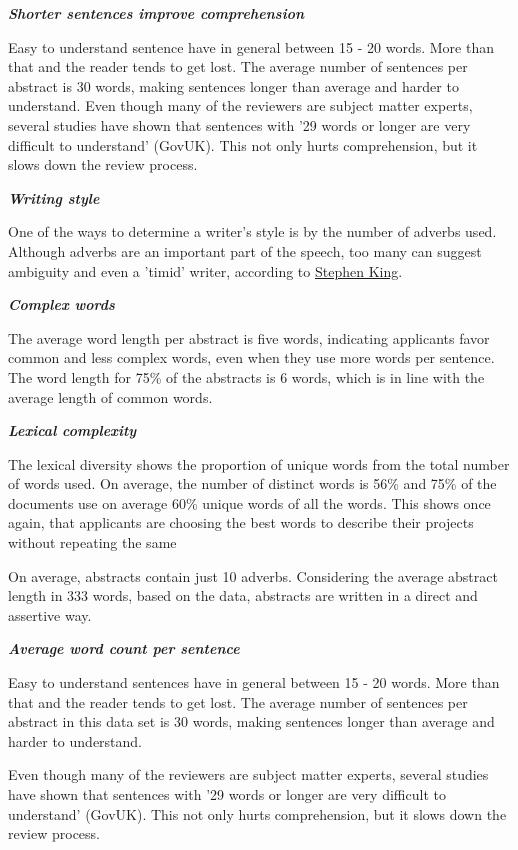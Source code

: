 \documentclass[11pt, oneside]{article}   	%
\begin{document}
\break
\textbf{\emph{Shorter sentences improve comprehension} }
 
Easy to understand sentence have in general between 15 - 20 words. More than that and the reader tends to get lost. The average number of sentences per abstract is 30 words, making sentences longer than average and harder to understand. Even though many of the reviewers are subject matter experts, several studies have shown that sentences with '29 words or longer are very difficult to understand' (GovUK). This not only hurts comprehension, but it slows down the review process.

\textbf{\emph{Writing style} } 

One of the ways to determine a writer's style is by the number of adverbs used. Although adverbs are an important part of the speech, too many can suggest ambiguity and even a 'timid' writer, according to \href{https://www.brainpickings.org/2013/03/13/stephen-king-on-adverbs/}{Stephen King}. 
 
\textbf{\emph{Complex words} } 

The average word length per abstract is five words, indicating applicants favor common and less complex words, even when they use more words per sentence. The word length for 75\% of the abstracts is 6 words, which is in line with the average length of common words.

\textbf{\emph{Lexical complexity} } 

The lexical diversity shows the proportion of unique words from the total number of words used. On average, the number of distinct words is 56\% and 75\% of the documents use on average 60\% unique words of all the words. This shows once again, that applicants are choosing the best words to describe their projects without repeating the same 

On average, abstracts contain just 10 adverbs. Considering the average abstract length in 333 words, based on the data, abstracts are written in a  direct and assertive way. 

\textbf{\emph{Average word count per sentence}}

Easy to understand sentences have in general between 15 - 20 words. More than that and the reader tends to get lost. The average number of sentences per abstract in this data set is 30 words, making sentences longer than average and harder to understand.

Even though many of the reviewers are subject matter experts, several studies have shown that sentences with '29 words or longer are very difficult to understand' (GovUK). This not only hurts comprehension, but it slows down the review process.
\end{document}
